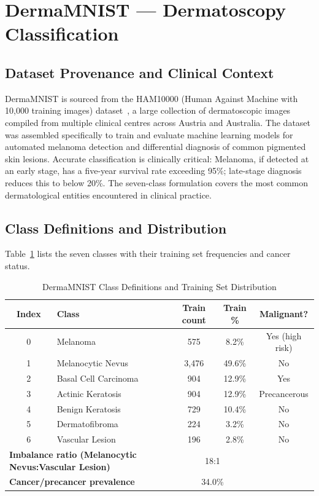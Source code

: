 \section{DermaMNIST — Dermatoscopy Classification}

\subsection{Dataset Provenance and Clinical Context}

DermaMNIST is sourced from the HAM10000 (Human Against Machine with 10,000 training images) dataset~\cite{tschandl2018ham10000}, a large collection of dermatoscopic images compiled from multiple clinical centres across Austria and Australia. The dataset was assembled specifically to train and evaluate machine learning models for automated melanoma detection and differential diagnosis of common pigmented skin lesions. Accurate classification is clinically critical: Melanoma, if detected at an early stage, has a five-year survival rate exceeding 95\%; late-stage diagnosis reduces this to below 20\%. The seven-class formulation covers the most common dermatological entities encountered in clinical practice.

\subsection{Class Definitions and Distribution}

Table~\ref{tab:dermamnist_classes} lists the seven classes with their training set frequencies and cancer status.

\begin{table}[h]
\footnotesize
\centering
\caption{DermaMNIST Class Definitions and Training Set Distribution}
\label{tab:dermamnist_classes}
\begin{tabular}{clccc}
\toprule
\textbf{Index} & \textbf{Class} & \textbf{Train count} & \textbf{Train \%} & \textbf{Malignant?} \\
\midrule
0 & Melanoma               & 575  & 8.2\%  & Yes (high risk) \\
1 & Melanocytic Nevus      & 3,476 & 49.6\% & No              \\
2 & Basal Cell Carcinoma   & 904  & 12.9\% & Yes             \\
3 & Actinic Keratosis      & 904  & 12.9\% & Precancerous    \\
4 & Benign Keratosis       & 729  & 10.4\% & No              \\
5 & Dermatofibroma         & 224  & 3.2\%  & No              \\
6 & Vascular Lesion        & 196  & 2.8\%  & No              \\
\midrule
\multicolumn{2}{l}{\textbf{Imbalance ratio (Melanocytic Nevus:Vascular Lesion)}} & \multicolumn{2}{c}{18:1} \\
\multicolumn{2}{l}{\textbf{Cancer/precancer prevalence}} & \multicolumn{2}{c}{34.0\%} \\
\bottomrule
\end{tabular}
\end{table}

